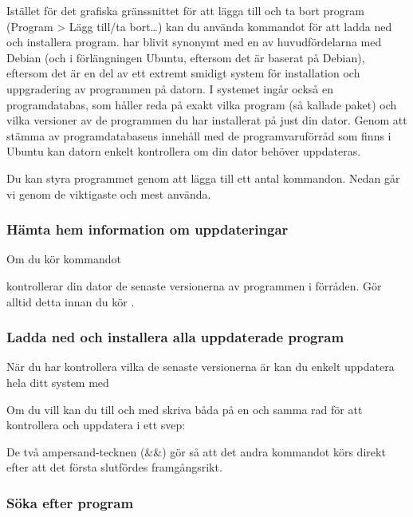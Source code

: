\documentclass[a4paper,final]{memoir} %
\begin{document}
Istället för det grafiska gränssnittet för att lägga till och ta bort program (Program \textgreater{} Lägg till/ta bort\ldots{}) kan du använda kommandot  för att ladda ned och installera program.  har blivit synonymt med en av huvudfördelarna med Debian (och i förlängningen Ubuntu, eftersom det är baserat på Debian), eftersom det är en del av ett extremt smidigt system för installation och uppgradering av programmen på datorn. I systemet ingår också en programdatabas, som håller reda på exakt vilka program (så kallade paket) och vilka versioner av de programmen du har installerat på just din dator. Genom att stämma av programdatabasens innehåll med de programvaruförråd som finns i Ubuntu kan datorn enkelt kontrollera om din dator behöver uppdateras.

Du kan styra programmet  genom att lägga till ett antal kommandon. Nedan går vi genom de viktigaste och mest använda.

\subsubsection{Hämta hem information om uppdateringar}

Om du kör kommandot 

  

kontrollerar din dator de senaste versionerna av programmen i förråden. Gör alltid detta innan du kör .

\subsubsection{Ladda ned och installera alla uppdaterade program}

När du har kontrollera vilka de senaste versionerna är kan du enkelt uppdatera hela ditt system med


Om du vill kan du till och med skriva båda på en och samma rad för att kontrollera och uppdatera i ett svep:


De två ampersand-tecknen (\&\&) gör så att det andra kommandot körs direkt efter att det första slutfördes framgångsrikt.

\subsubsection{Söka efter program}
\end{document}
